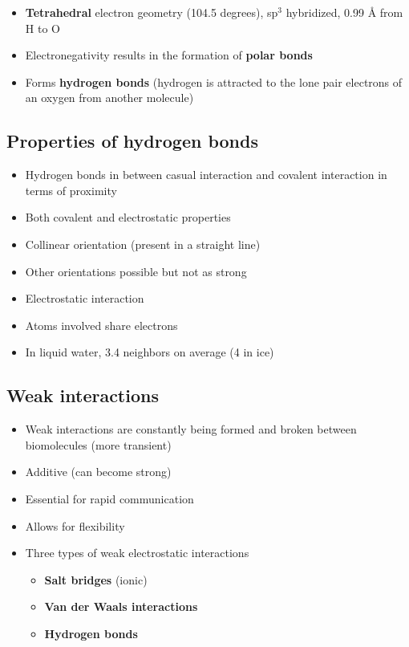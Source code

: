 \documentclass[a4paper, 12pt]{article}
\begin{document}
\begin{itemize}
\item \textbf{Tetrahedral} electron geometry (104.5 degrees),  sp$^3$ hybridized, 0.99 Å from H to O
\item Electronegativity results in the formation of \textbf{polar bonds}
\item Forms \textbf{hydrogen bonds} (hydrogen is attracted to the lone pair electrons of an oxygen from another molecule)
\end{itemize}

\subsection*{Properties of hydrogen bonds}

\begin{itemize}
\item Hydrogen bonds in between casual interaction and covalent interaction in terms of proximity
\item Both covalent and electrostatic properties
\item Collinear orientation (present in a straight line)
\item Other orientations possible but not as strong
\item Electrostatic interaction
\item Atoms involved share electrons
\item In liquid water, 3.4 neighbors on average (4 in ice)
\end{itemize}

\subsection*{Weak interactions}

\begin{itemize}
\item Weak interactions are constantly being formed and broken between biomolecules (more transient)
\item Additive (can become strong)
\item Essential for rapid communication
\item Allows for flexibility
\item Three types of weak electrostatic interactions
\begin{itemize}
\item \textbf{Salt bridges} (ionic)
\item \textbf{Van der Waals interactions}
\item \textbf{Hydrogen bonds}
\end{itemize}
\end{itemize}
\end{document}
